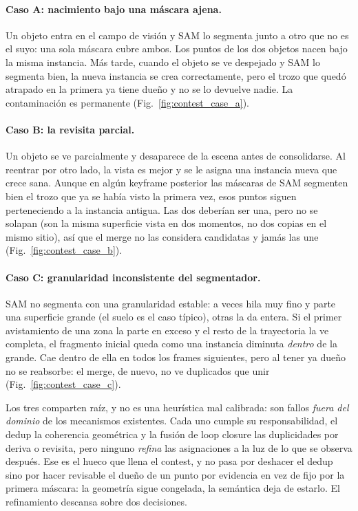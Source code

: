 \paragraph{Caso A: nacimiento bajo una máscara ajena.}
Un objeto entra en el campo de visión y SAM lo segmenta junto a otro que no es el suyo:
una sola máscara cubre ambos. Los puntos de los dos objetos nacen bajo la misma
instancia. Más tarde, cuando el objeto se ve despejado y SAM lo segmenta bien, la nueva
instancia se crea correctamente, pero el trozo que quedó atrapado en la primera ya tiene
dueño y no se lo devuelve nadie. La contaminación es permanente (Fig.~\ref{fig:contest_case_a}).

\paragraph{Caso B: la revisita parcial.}
Un objeto se ve parcialmente y desaparece de la escena antes de consolidarse. Al reentrar
por otro lado, la vista es mejor y se le asigna una instancia nueva que crece sana. Aunque
en algún \foreignlanguage{english}{keyframe} posterior las máscaras de SAM segmenten bien
el trozo que ya se había visto la primera vez, esos puntos siguen perteneciendo a la
instancia antigua. Las dos deberían ser una, pero no se solapan (son la misma superficie
vista en dos momentos, no dos copias en el mismo sitio), así que el merge no las
considera candidatas y jamás las une (Fig.~\ref{fig:contest_case_b}).

\paragraph{Caso C: granularidad inconsistente del segmentador.}
SAM no segmenta con una granularidad estable: a veces hila muy fino y parte una superficie
grande (el suelo es el caso típico), otras la da entera. Si el primer avistamiento de una
zona la parte en exceso y el resto de la trayectoria la ve completa, el fragmento inicial
queda como una instancia diminuta \emph{dentro} de la grande. Cae dentro de ella en todos
los frames siguientes, pero al tener ya dueño no se reabsorbe: el merge, de nuevo, no ve
duplicados que unir (Fig.~\ref{fig:contest_case_c}).

Los tres comparten raíz, y no es una heurística mal calibrada: son fallos \emph{fuera del
dominio} de los mecanismos existentes. Cada uno cumple su responsabilidad, el dedup la
coherencia geométrica y la fusión de \foreignlanguage{english}{loop closure} las
duplicidades por deriva o revisita, pero ninguno \emph{refina} las asignaciones a la luz de
lo que se observa después. Ese es el hueco que llena el contest, y no pasa por deshacer el
dedup sino por hacer revisable el dueño de un punto por evidencia en vez de fijo por la
primera máscara: la geometría sigue congelada, la semántica deja de estarlo. El
refinamiento descansa sobre dos decisiones.

